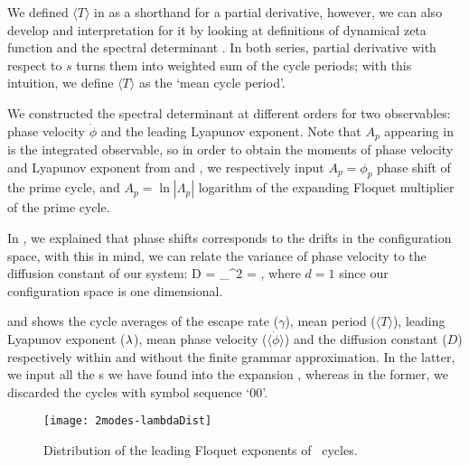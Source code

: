 {{{We defined $\langle T \rangle$ in  as a shorthand for a partial
derivative, however, we can also develop and interpretation for it by looking at
definitions of dynamical zeta function  and the spectral 
determinant . In both series, partial derivative with
respect to $s$ turns them into weighted sum of the cycle periods; with this intuition, 
we define $\langle T \rangle$ as the `mean cycle period'.

We constructed the spectral determinant  at different 
orders for two observables: phase velocity $\dot{\phi}$ and the leading Lyapunov 
exponent. Note that $A_p$ appearing in  is the
integrated observable, so in order to obtain the moments of phase velocity and
Lyapunov exponent from  and , we respectively input 
$A_p = \phi_p$ phase shift of the prime cycle, and $A_p = \ln |\Lambda_p|$ logarithm
of the expanding Floquet multiplier of the prime cycle. 

In , we explained that  phase shifts corresponds to 
the drifts in the configuration space, with this in mind, we can relate the 
variance of phase velocity to the diffusion constant of our system:
\beq
    D =  \sigma_{\dot{\phi}}^2 
      =  ,
\eeq
where $d=1$ since our configuration space is one dimensional. 

 and  shows
the cycle averages of the escape rate ($\gamma$), mean period ($\langle T \rangle$),
leading Lyapunov exponent ($\lambda$), mean phase velocity ($\langle \dot{\phi} \rangle$)
and the diffusion constant ($D$) respectively within and without the finite grammar 
approximation. In the latter, we input all the \rpo s we have found into the expansion
, whereas in the former, we discarded the cycles
with symbol sequence `00'.




\begin{figure}%
\centering
 \texttt{[image: 2modes-lambdaDist]}
\caption{Distribution of the leading Floquet exponents of \twomode\ cycles.}
\label{f-2modes-lambdaDist}
\end{figure}

}}}
